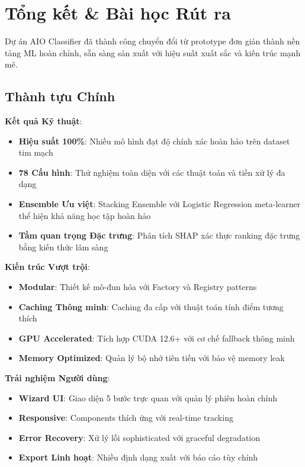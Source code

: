 \section{Tổng kết \& Bài học Rút ra}\label{sec:conclusion}

\noindent
Dự án AIO Classifier đã thành công chuyển đổi từ prototype đơn giản thành nền tảng ML hoàn chỉnh, sẵn sàng sản xuất với hiệu suất xuất sắc và kiến trúc mạnh mẽ.

\subsection{Thành tựu Chính}\label{subsec:achievements}

\textbf{Kết quả Kỹ thuật}:
\begin{itemize}
    \item \textbf{Hiệu suất 100\%}: Nhiều mô hình đạt độ chính xác hoàn hảo trên dataset tim mạch
    \item \textbf{78 Cấu hình}: Thử nghiệm toàn diện với các thuật toán và tiền xử lý đa dạng
    \item \textbf{Ensemble Ưu việt}: Stacking Ensemble với Logistic Regression meta-learner thể hiện khả năng học tập hoàn hảo
    \item \textbf{Tầm quan trọng Đặc trưng}: Phân tích SHAP xác thực ranking đặc trưng bằng kiến thức lâm sàng
\end{itemize}

\textbf{Kiến trúc Vượt trội}:
\begin{itemize}
    \item \textbf{Modular}: Thiết kế mô-đun hóa với Factory và Registry patterns
    \item \textbf{Caching Thông minh}: Caching đa cấp với thuật toán tính điểm tương thích
    \item \textbf{GPU Accelerated}: Tích hợp CUDA 12.6+ với cơ chế fallback thông minh
    \item \textbf{Memory Optimized}: Quản lý bộ nhớ tiên tiến với bảo vệ memory leak
\end{itemize}

\textbf{Trải nghiệm Người dùng}:
\begin{itemize}
    \item \textbf{Wizard UI}: Giao diện 5 bước trực quan với quản lý phiên hoàn chỉnh
    \item \textbf{Responsive}: Components thích ứng với real-time tracking
    \item \textbf{Error Recovery}: Xử lý lỗi sophisticated với graceful degradation
    \item \textbf{Export Linh hoạt}: Nhiều định dạng xuất với báo cáo tùy chỉnh
\end{itemize}

